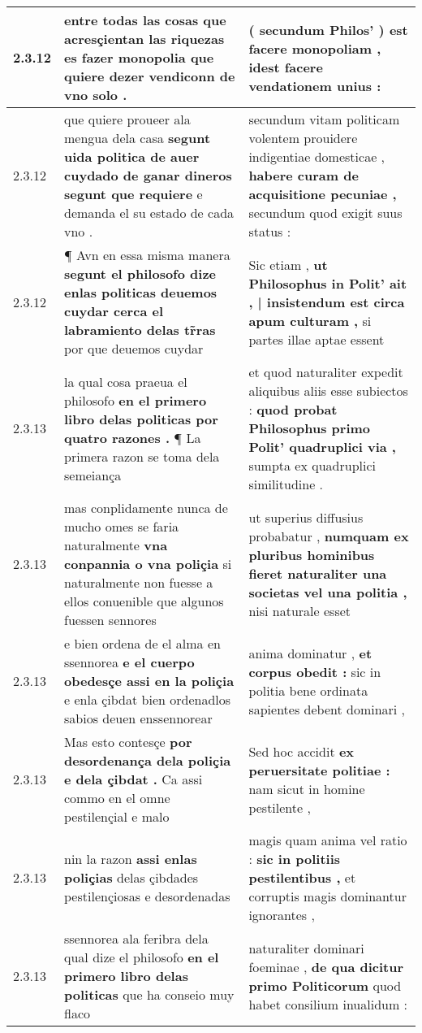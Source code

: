 \begin{tabular}{|p{1cm}|p{6.5cm}|p{6.5cm}|}
2.3.12 & entre todas las cosas \textbf{ que acresçientan las riquezas es fazer monopolia } que quiere dezer vendiconn de vno solo . & ( secundum Philos’ ) \textbf{ est facere monopoliam , } idest facere vendationem unius : \\\hline
2.3.12 & que quiere proueer ala mengua dela casa \textbf{ segunt uida politica de auer cuydado de ganar dineros segunt que requiere } e demanda el su estado de cada vno . & secundum vitam politicam volentem prouidere indigentiae domesticae , \textbf{ habere curam de acquisitione pecuniae , } secundum quod exigit suus status : \\\hline
2.3.12 & ¶ Avn en essa misma manera \textbf{ segunt el philosofo dize enlas politicas deuemos cuydar cerca el labramiento delas tr̃ras } por que deuemos cuydar & Sic etiam , \textbf{ ut Philosophus in Polit’ ait , | insistendum est circa apum culturam , } si partes illae aptae essent \\\hline
2.3.13 & la qual cosa praeua el philosofo \textbf{ en el primero libro delas politicas por quatro razones . } ¶ La primera razon se toma dela semeiança & et quod naturaliter expedit aliquibus aliis esse subiectos : \textbf{ quod probat Philosophus primo Polit’ quadruplici via , } sumpta ex quadruplici similitudine . \\\hline
2.3.13 & mas conplidamente nunca de mucho omes se faria naturalmente \textbf{ vna conpannia o vna poliçia } si naturalmente non fuesse a ellos conuenible que algunos fuessen sennores & ut superius diffusius probabatur , \textbf{ numquam ex pluribus hominibus fieret naturaliter una societas vel una politia , } nisi naturale esset \\\hline
2.3.13 & e bien ordena de el alma en ssennorea \textbf{ e el cuerpo obedesçe assi en la poliçia } e enla çibdat bien ordenadlos sabios deuen enssennorear & anima dominatur , \textbf{ et corpus obedit : } sic in politia bene ordinata sapientes debent dominari , \\\hline
2.3.13 & Mas esto contesçe \textbf{ por desordenança dela poliçia e dela çibdat . } Ca assi commo en el omne pestilençial e malo & Sed hoc accidit \textbf{ ex peruersitate politiae : } nam sicut in homine pestilente , \\\hline
2.3.13 & nin la razon \textbf{ assi enlas poliçias } delas çibdades pestilençiosas e desordenadas & magis quam anima vel ratio : \textbf{ sic in politiis pestilentibus , } et corruptis magis dominantur ignorantes , \\\hline
2.3.13 & ssennorea ala feribra dela qual dize el philosofo \textbf{ en el primero libro delas politicas } que ha conseio muy flaco & naturaliter dominari foeminae , \textbf{ de qua dicitur primo Politicorum } quod habet consilium inualidum : \\\hline

\end{tabular}
